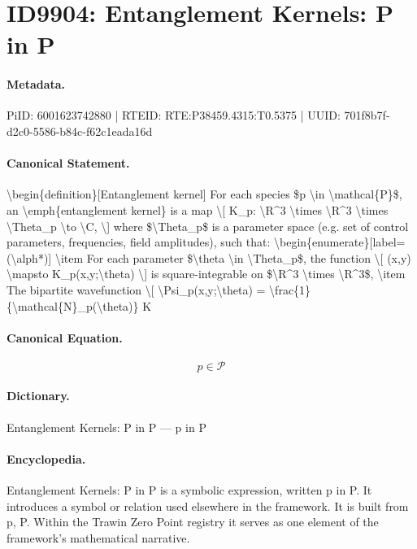 \section*{ID9904: Entanglement Kernels: P in P}
\paragraph{Metadata.}
PiID: 6001623742880 | RTEID: RTE:P38459.4315:T0.5375 | UUID: 701f8b7f-d2c0-5586-b84c-f62c1eada16d

\paragraph{Canonical Statement.}
\textbackslash{}begin\{definition\}[Entanglement kernel] For each species \$p \textbackslash{}in \textbackslash{}mathcal\{P\}\$, an \textbackslash{}emph\{entanglement kernel\} is a map \textbackslash{}[ K\_p: \textbackslash{}R\textasciicircum{}3 \textbackslash{}times \textbackslash{}R\textasciicircum{}3 \textbackslash{}times \textbackslash{}Theta\_p \textbackslash{}to \textbackslash{}C, \textbackslash{}] where \$\textbackslash{}Theta\_p\$ is a parameter space (e.g. set of control parameters, frequencies, field amplitudes), such that: \textbackslash{}begin\{enumerate\}[label=(\textbackslash{}alph*)] \textbackslash{}item For each parameter \$\textbackslash{}theta \textbackslash{}in \textbackslash{}Theta\_p\$, the function \textbackslash{}[ (x,y) \textbackslash{}mapsto K\_p(x,y;\textbackslash{}theta) \textbackslash{}] is square-integrable on \$\textbackslash{}R\textasciicircum{}3 \textbackslash{}times \textbackslash{}R\textasciicircum{}3\$, \textbackslash{}item The bipartite wavefunction \textbackslash{}[ \textbackslash{}Psi\_p(x,y;\textbackslash{}theta) = \textbackslash{}frac\{1\}\{\textbackslash{}mathcal\{N\}\_p(\textbackslash{}theta)\} K

\paragraph{Canonical Equation.}
\[
p \in \mathcal{P}
\]

\paragraph{Dictionary.}
Entanglement Kernels: P in P — p in P

\paragraph{Encyclopedia.}
Entanglement Kernels: P in P is a symbolic expression, written p in P. It introduces a symbol or relation used elsewhere in the framework. It is built from p, P. Within the Trawin Zero Point registry it serves as one element of the framework's mathematical narrative.
